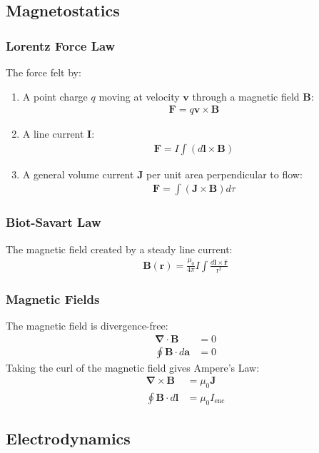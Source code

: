 \documentclass[11pt]{article}
\newcommand{\ve}[1]{\ensuremath{\bm{#1}}}			%
\newcommand{\dr}{\ensuremath{\text{r}}}				%
\newcommand{\dvr}{\ensuremath{\textbf{r}}}			%
\newcommand{\dvrhat}{\ensuremath{\ve{\hat{\dvr}}}}	%
\begin{document}
\begin{multicols*}{3}
\subsection{Magnetostatics}
\subsubsection{Lorentz Force Law}
The force felt by:
\begin{enumerate}
\item A point charge $q$ moving at velocity $\ve{v}$ through a magnetic field $\ve{B}$:
	\begin{align*}
	\ve{F}=q\ve{v}\times\ve{B}
	\end{align*}
\item A line current $\ve{I}$:
	\begin{align*}
	\ve{F}=I\int(d\ve{l}\times\ve{B})
	\end{align*}
\item A general volume current $\ve{J}$ per unit area perpendicular to flow:
	\begin{align*}
	\ve{F}=\int(\ve{J}\times\ve{B})d\tau
	\end{align*}
 \end{enumerate}
\subsubsection{Biot-Savart Law}
The magnetic field created by a steady line current:
	\begin{align*}
	\ve{B}(\ve{r})= \frac{\mu_0}{4\pi}I\int\frac{d\ve{l}\times\dvrhat}{\dr^2}
	\end{align*}
\subsubsection{Magnetic Fields}
The magnetic field is divergence-free:
	\begin{align*}
	\ve{\nabla}\cdot\ve{B}&=0\\
	\oint\ve{B}\cdot d\ve{a}&=0
	\end{align*}
Taking the curl of the magnetic field gives Ampere's Law:
	\begin{align*}
	\ve{\nabla}\times\ve{B}&=\mu_0\ve{J}\\
	\oint\ve{B}\cdot d\ve{l}&=\mu_0 I_{\text{enc}}
	\end{align*}
\subsection{Electrodynamics}

\end{multicols*}
\end{document}
